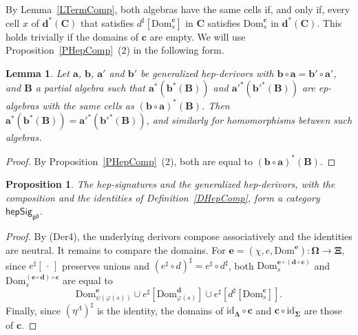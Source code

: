 \documentclass[a4paper,reqno]{amsart}
\newcommand{\sig}[1]{\mathbf{#1}}                %
\newcommand{\Dom}{\mathrm{Dom}}
\newcommand{\id}{\mathrm{id}}
\newcommand{\gd}{\mathfrak{gd}}
\newcommand{\mor}{\to}
\theoremstyle{plain}
\newtheorem{proposition}[theorem]{Proposition}
\newtheorem{lemma}[theorem]{Lemma}
\theoremstyle{definition}
\begin{document}
By Lemma~\ref{LTermComp}, both algebras have the same cells if, and only if, every cell $x$ of $\mathbf{d}^{\ast}(\mathbf{C})$ that satisfies $d^{\sharp}[\Dom^{\mathbf{c}}_{s}]$ in $\mathbf{C}$ satisfies $\Dom^{\mathbf{c}}_{s}$ in $\mathbf{d}^{\ast}(\mathbf{C})$.
This holds trivially if the domains of $\mathbf{c}$ are empty.
We will use Proposition~\ref{PHepComp}~(2) in the following form.

\begin{lemma}\label{LCommSquare}
Let $\mathbf{a}$, $\mathbf{b}$, $\mathbf{a}'$ and $\mathbf{b}'$ be generalized hep-derivors with $\mathbf{b}\circ\mathbf{a}=\mathbf{b}'\circ\mathbf{a}'$, and $\mathbf{B}$ a partial algebra such that $\mathbf{a}^{\ast}(\mathbf{b}^{\ast}(\mathbf{B}))$ and $\mathbf{a}'^{\ast}(\mathbf{b}'^{\ast}(\mathbf{B}))$ are ep-algebras with the same cells as $(\mathbf{b}\circ\mathbf{a})^{\ast}(\mathbf{B})$.
Then $\mathbf{a}^{\ast}(\mathbf{b}^{\ast}(\mathbf{B}))=\mathbf{a}'^{\ast}(\mathbf{b}'^{\ast}(\mathbf{B}))$, and similarly for homomorphisms between such algebras.
\end{lemma}
\begin{proof}
By Proposition~\ref{PHepComp}~(2), both are equal to $(\mathbf{b}\circ\mathbf{a})^{\ast}(\mathbf{B})$.
\end{proof}

\begin{proposition}\label{PHepSigCat}
The hep-signatures and the generalized hep-derivors, with the composition and the identities of Definition~\ref{DHepComp}, form a category $\mathsf{hepSig}_{\gd}$.
\end{proposition}
\begin{proof}
By (Der4), the underlying derivors compose associatively and the identities are neutral.
It remains to compare the domains.
For $\mathbf{e}=(\chi,e,\Dom^{\mathbf{e}})\colon\sig{\Omega}\mor\sig{\Xi}$, since $e^{\sharp}[\,\cdot\,]$ preserves unions and $(e^{\sharp}\circ d)^{\sharp}=e^{\sharp}\circ d^{\sharp}$, both $\Dom^{\mathbf{e}\circ(\mathbf{d}\circ\mathbf{c})}_{s}$ and $\Dom^{(\mathbf{e}\circ\mathbf{d})\circ\mathbf{c}}_{s}$ are equal to
$$
\Dom^{\mathbf{e}}_{\psi(\varphi(s))}\cup e^{\sharp}\left[\Dom^{\mathbf{d}}_{\varphi(s)}\right]\cup e^{\sharp}\left[d^{\sharp}\left[\Dom^{\mathbf{c}}_{s}\right]\right].
$$
Finally, since $(\eta^{\Lambda})^{\sharp}$ is the identity, the domains of $\id_{\sig{\Lambda}}\circ\mathbf{c}$ and $\mathbf{c}\circ\id_{\sig{\Sigma}}$ are those of $\mathbf{c}$.
\end{proof}
\end{document}

